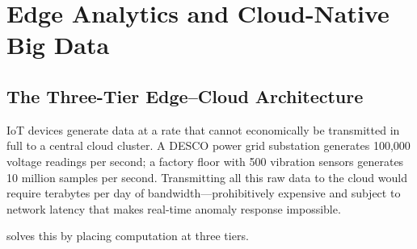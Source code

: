 \section{Edge Analytics and Cloud-Native Big Data}
\label{sec:edge-cloud}

\subsection{The Three-Tier Edge--Cloud Architecture}
\label{subsec:three-tier}

IoT devices generate data at a rate that cannot economically be
transmitted in full to a central cloud cluster. A DESCO power grid
substation generates 100{,}000 voltage readings per second; a factory
floor with 500 vibration sensors generates 10 million samples per second.
Transmitting all this raw data to the cloud would require terabytes per
day of bandwidth---prohibitively expensive and subject to network latency
that makes real-time anomaly response impossible.

 solves this by placing computation at three tiers.

